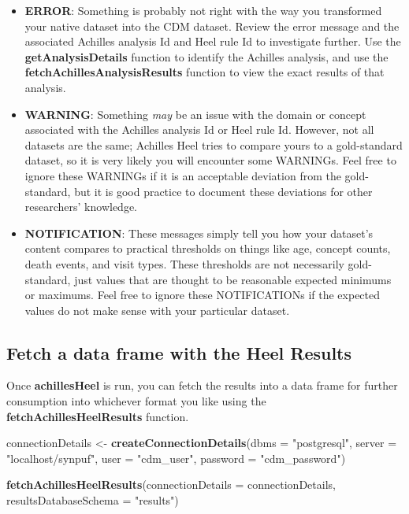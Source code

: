 \documentclass[]{article}
\newenvironment{Shaded}{\begin{snugshade}}{\end{snugshade}}
\newcommand{\KeywordTok}[1]{\textcolor[rgb]{0.13,0.29,0.53}{\textbf{#1}}}
\newcommand{\DataTypeTok}[1]{\textcolor[rgb]{0.13,0.29,0.53}{#1}}
\newcommand{\StringTok}[1]{\textcolor[rgb]{0.31,0.60,0.02}{#1}}
\newcommand{\NormalTok}[1]{#1}
\providecommand{\tightlist}{%
  \setlength{\itemsep}{0pt}\setlength{\parskip}{0pt}}
\begin{document}
\begin{itemize}
\tightlist
\item
  \textbf{ERROR}: Something is probably not right with the way you
  transformed your native dataset into the CDM dataset. Review the error
  message and the associated Achilles analysis Id and Heel rule Id to
  investigate further. Use the \textbf{getAnalysisDetails} function to
  identify the Achilles analysis, and use the
  \textbf{fetchAchillesAnalysisResults} function to view the exact
  results of that analysis.
\item
  \textbf{WARNING}: Something \emph{may} be an issue with the domain or
  concept associated with the Achilles analysis Id or Heel rule Id.
  However, not all datasets are the same; Achilles Heel tries to compare
  yours to a gold-standard dataset, so it is very likely you will
  encounter some WARNINGs. Feel free to ignore these WARNINGs if it is
  an acceptable deviation from the gold-standard, but it is good
  practice to document these deviations for other researchers'
  knowledge.
\item
  \textbf{NOTIFICATION}: These messages simply tell you how your
  dataset's content compares to practical thresholds on things like age,
  concept counts, death events, and visit types. These thresholds are
  not necessarily gold-standard, just values that are thought to be
  reasonable expected minimums or maximums. Feel free to ignore these
  NOTIFICATIONs if the expected values do not make sense with your
  particular dataset.
\end{itemize}

\subsection{Fetch a data frame with the Heel
Results}\label{fetch-a-data-frame-with-the-heel-results}

Once \textbf{achillesHeel} is run, you can fetch the results into a data
frame for further consumption into whichever format you like using the
\textbf{fetchAchillesHeelResults} function.

\begin{Shaded}
\begin{Highlighting}[]
\NormalTok{connectionDetails <-}\StringTok{ }\KeywordTok{createConnectionDetails}\NormalTok{(}\DataTypeTok{dbms =} \StringTok{"postgresql"}\NormalTok{, }
                                             \DataTypeTok{server =} \StringTok{"localhost/synpuf"}\NormalTok{, }
                                             \DataTypeTok{user =} \StringTok{"cdm_user"}\NormalTok{, }
                                             \DataTypeTok{password =} \StringTok{"cdm_password"}\NormalTok{)}

\KeywordTok{fetchAchillesHeelResults}\NormalTok{(}\DataTypeTok{connectionDetails =}\NormalTok{ connectionDetails, }
                         \DataTypeTok{resultsDatabaseSchema =} \StringTok{"results"}\NormalTok{)}
\end{Highlighting}
\end{Shaded}
\end{document}
